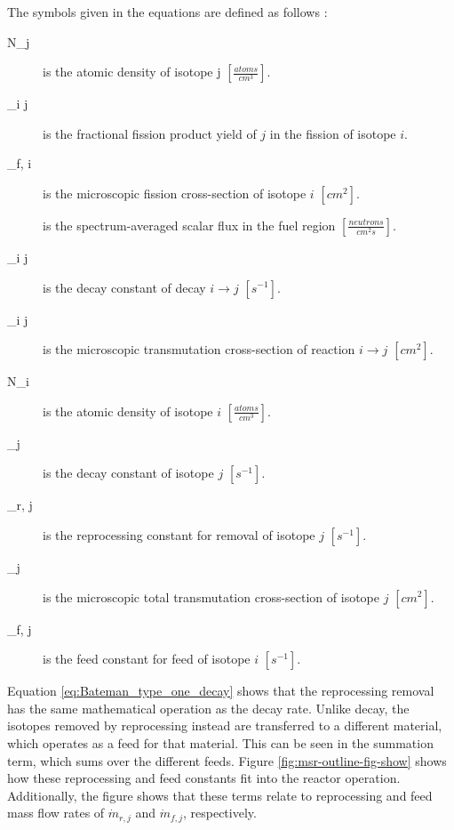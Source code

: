 The symbols given in the equations are defined as follows \cite{leppanen_development_2007}:
\begin{description}
\item[N_j] is the atomic density of isotope j $\left[\frac{atoms}{cm^3}\right]$.
\item[\gamma_{i \rightarrow j}] is the fractional fission product yield of $j$ in the fission of isotope $i$.
\item[\sigma_{f, i}] is the microscopic fission cross-section of isotope $i$ $\left[cm^2\right]$.
\item[\Phi] is the spectrum-averaged scalar flux in the fuel region $\left[\frac{neutrons}{cm^2 s}\right]$.
\item[\lambda _{i \rightarrow j}] is the decay constant of decay $i \rightarrow j$ $\left[s^{-1}\right]$.
\item[\sigma_{i \rightarrow j}] is the microscopic transmutation cross-section of reaction $i \rightarrow j$ $\left[cm^2\right]$.
\item[N_i] is the atomic density of isotope $i$ $\left[\frac{atoms}{cm^3}\right]$.
\item[\lambda_j] is the decay constant of isotope $j$ $\left[s^{-1}\right]$.
\item[\lambda_{r, j}] is the reprocessing constant for removal of isotope $j$ $\left[s^{-1}\right]$.
\item[\sigma_j] is the microscopic total transmutation cross-section of isotope $j$ $\left[cm^2\right]$.
\item[\lambda _{f, j}] is the feed constant for feed of isotope $i$ $\left[s^{-1}\right]$.
\end{description}

Equation \eqref{eq:Bateman_type_one_decay} shows that the reprocessing removal has the same mathematical operation as the decay rate. Unlike decay, the isotopes removed by reprocessing instead are transferred to a different material, which operates as a feed for that material. This can be seen in the summation term, which sums over the different feeds. Figure \ref{fig:msr-outline-fig-show} shows how these reprocessing and feed constants fit into the reactor operation. Additionally, the figure shows that these terms relate to reprocessing and feed mass flow rates of $\dot{m}_{r, j}$ and $\dot{m}_{f, j}$, respectively.



